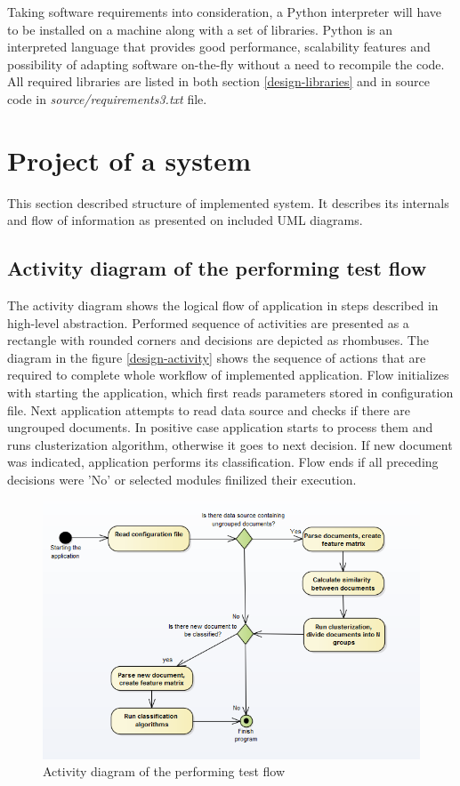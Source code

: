 Taking software requirements into consideration, a Python interpreter will have to be installed on a machine along with a set of libraries. Python is an interpreted language that provides good performance, scalability features and possibility of adapting software on-the-fly without a need to recompile the code. All required libraries are listed in both section \ref{design-libraries} and in source code in \textit{source/requirements3.txt} file.
 
 
\section{Project of a system} \label{project}
 This section described structure of implemented system. It describes its internals and flow of information as presented on included UML diagrams.
 
\subsection{Activity diagram of the performing test flow}
The activity diagram shows the logical flow of application in steps described in high-level abstraction. Performed sequence of activities are presented as a rectangle with rounded corners and decisions are depicted as rhombuses. The diagram in the figure \ref{design-activity} shows the sequence of actions that are required to complete whole workflow of implemented application. Flow initializes with starting the application, which first reads parameters stored in configuration file. Next application attempts to read data source and checks if there are ungrouped documents. In positive case application starts to process them and runs clusterization algorithm, otherwise it goes to next decision. If new document was indicated, application performs its classification.  Flow ends if all preceding decisions were 'No' or selected modules finilized their execution.

\begin{figure}[H]
	\begin{center}
		\includegraphics[width=1.0\linewidth]{images/diagrams/activity.PNG}
		\caption{Activity diagram of the performing test flow}
		\label{design-activity-diagram}
	\end{center}
\end{figure}


